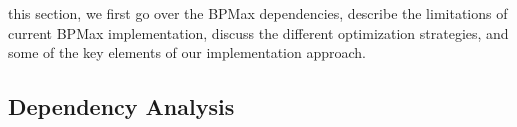  this section, we first go over the  BPMax dependencies, describe the limitations of current BPMax implementation, discuss the different optimization strategies, and some of the key elements of our implementation approach.

\subsection{Dependency Analysis}















